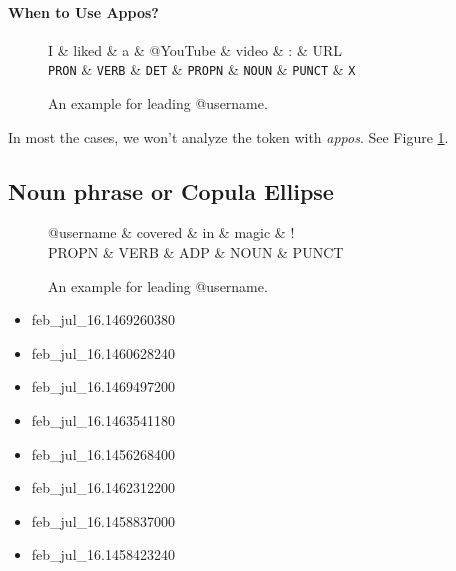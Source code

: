 \documentclass[11pt,a4paper]{article}
\begin{document}
\paragraph{When to Use Appos?}
\begin{figure}[t]
	\centering
	\small
	\begin{dependency}[edge slant=2, text only label, label style=above]
		\begin{deptext}
			I \& liked \& a \& @YouTube \& video \& : \& URL \\
			\texttt{PRON} \& \texttt{VERB} \& \texttt{DET} \& \texttt{PROPN} \& \texttt{NOUN} \& \texttt{PUNCT} \& \texttt{X} \\
		\end{deptext}
	\end{dependency}
	\caption{An example for leading @username.}\label{fig:case-02}
\end{figure}

In most the cases, we won't analyze the token with \textit{appos}.
See Figure \ref{fig:case-02}.

\subsection{Noun phrase or Copula Ellipse}
\begin{figure}[t]
	\centering
	\small
	\begin{dependency}[edge slant=2, text only label, label style=above]
		\begin{deptext}
			@username \& covered \& in \& magic \& ! \\
			PROPN \& VERB \& ADP \& NOUN \& PUNCT \\
		\end{deptext}
	\end{dependency}
	\caption{An example for leading @username.}\label{fig:case-05-1}
\end{figure}

\begin{itemize}
	\item feb\_jul\_16.1469260380
	\item feb\_jul\_16.1460628240
	\item feb\_jul\_16.1469497200
	\item feb\_jul\_16.1463541180
	\item feb\_jul\_16.1456268400
	\item feb\_jul\_16.1462312200
	\item feb\_jul\_16.1458837000
	\item feb\_jul\_16.1458423240
\end{itemize}
\end{document}
